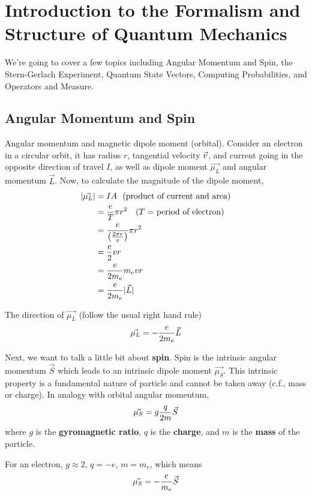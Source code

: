 \documentclass[english, 11pt]{article}
\begin{document}
   \section{Introduction to the Formalism and Structure of Quantum Mechanics}

     We're going to cover a few topics including Angular Momentum and Spin, the Stern-Gerlach Experiment, Quantum State Vectors, Computing Probabilities, and Operators and Measure.

     \subsection{Angular Momentum and Spin}

       Angular momentum and magnetic dipole moment (orbital). Consider an electron in a circular orbit, it has radius $r$, tangential velocity ${\vec{v}}$, and current going in the opposite direction of travel $I$, as well as dipole moment $\vec{\mu_L}$ and angular momentum $\vec{L}$. Now, to calculate the magnitude of the dipole moment,
       \begin{align*}
         |\vec{\mu_L}| & = IA \mbox{\ \ (product of current and area)} \\
                       & = \frac{e}{T} \pi r^2 \mbox{ \ \ ($T =$ period of electron)} \\
                       & = \frac{e}{\left( \frac{2 \pi r}{v} \right)} \pi r^2 \\
                       & = \frac{e}{2} vr \\
                       & = \frac{e}{2m_e} m_evr \\
                       & = \frac{e}{2m_e} |\vec{L}|
       \end{align*}

       The direction of $\vec{\mu_L}$ (follow the usual right hand rule)
       \[ \vec{\mu_L} = -\frac{e}{2m_e} \vec{L} \]

       Next, we want to talk a little bit about \textbf{spin}. Spin is the intrinsic angular momentum $\vec{S}$ which leads to an intrinsic dipole moment $\vec{\mu_S}$. This intrinsic property is a fundamental nature of particle and cannot be taken away (c.f., mass or charge). In analogy with orbital angular momentum,
       \[ \vec{\mu_S} = g\frac{q}{2m} \vec{S} \]
       where $g$ is the \textbf{gyromagnetic ratio}, $q$ is the \textbf{charge}, and $m$ is the \textbf{mass} of the particle.
       \newline

       For an electron, $g \approx 2$, $q = -e$, $m = m_e$, which means
       \[ \vec{\mu_S} = -\frac{e}{m_e} \vec{S} \]
\end{document}
